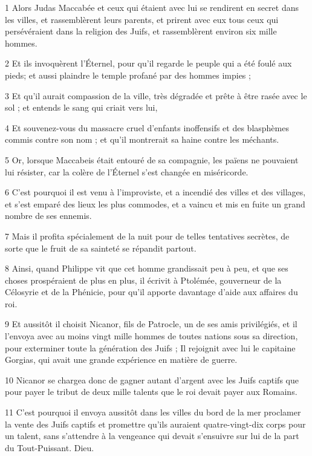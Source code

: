 \par 1 Alors Judas Maccabée et ceux qui étaient avec lui se rendirent en secret dans les villes, et rassemblèrent leurs parents, et prirent avec eux tous ceux qui persévéraient dans la religion des Juifs, et rassemblèrent environ six mille hommes.
\par 2 Et ils invoquèrent l'Éternel, pour qu'il regarde le peuple qui a été foulé aux pieds; et aussi plaindre le temple profané par des hommes impies ;
\par 3 Et qu'il aurait compassion de la ville, très dégradée et prête à être rasée avec le sol ; et entends le sang qui criait vers lui,
\par 4 Et souvenez-vous du massacre cruel d'enfants inoffensifs et des blasphèmes commis contre son nom ; et qu'il montrerait sa haine contre les méchants.
\par 5 Or, lorsque Maccabeis était entouré de sa compagnie, les païens ne pouvaient lui résister, car la colère de l'Éternel s'est changée en miséricorde.
\par 6 C'est pourquoi il est venu à l'improviste, et a incendié des villes et des villages, et s'est emparé des lieux les plus commodes, et a vaincu et mis en fuite un grand nombre de ses ennemis.
\par 7 Mais il profita spécialement de la nuit pour de telles tentatives secrètes, de sorte que le fruit de sa sainteté se répandit partout.
\par 8 Ainsi, quand Philippe vit que cet homme grandissait peu à peu, et que ses choses prospéraient de plus en plus, il écrivit à Ptolémée, gouverneur de la Célosyrie et de la Phénicie, pour qu'il apporte davantage d'aide aux affaires du roi.
\par 9 Et aussitôt il choisit Nicanor, fils de Patrocle, un de ses amis privilégiés, et il l'envoya avec au moins vingt mille hommes de toutes nations sous sa direction, pour exterminer toute la génération des Juifs ; Il rejoignit avec lui le capitaine Gorgias, qui avait une grande expérience en matière de guerre.
\par 10 Nicanor se chargea donc de gagner autant d'argent avec les Juifs captifs que pour payer le tribut de deux mille talents que le roi devait payer aux Romains.
\par 11 C'est pourquoi il envoya aussitôt dans les villes du bord de la mer proclamer la vente des Juifs captifs et promettre qu'ils auraient quatre-vingt-dix corps pour un talent, sans s'attendre à la vengeance qui devait s'ensuivre sur lui de la part du Tout-Puissant. Dieu.
